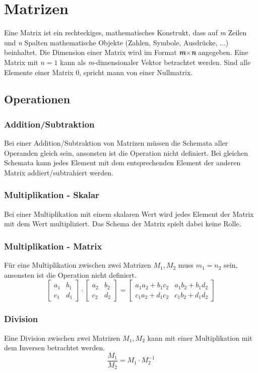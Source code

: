 \documentclass{article}
\author{Philipp Kiss}
\begin{document}
\section{Matrizen}
Eine Matrix ist ein rechteckiges, mathematisches Konstrukt, dass auf \textit{m} Zeilen und \textit{n} Spalten mathematische Objekte (Zahlen, Symbole, Ausdrücke, ...) beinhaltet. Die Dimension einer Matrix wird im Format \textbf{\textit{m}$\times$\textit{n}} angegeben. Eine Matrix mit $n = 1$ kann als \textit{m}-dimensionaler Vektor betrachtet werden. Sind alle Elemente einer Matrix 0, spricht mann von einer Nullmatrix.
\subsection{Operationen}
\subsubsection{Addition/Subtraktion}
Bei einer Addition/Subtraktion von Matrizen müssen die Schemata aller Operanden gleich sein, ansonsten ist die Operation nicht definiert. Bei gleichen Schemata kann jedes Element mit dem entsprechenden Element der anderen Matrix addiert/subtrahiert werden.
\subsubsection{Multiplikation - Skalar}
Bei einer Multiplikation mit einem skalaren Wert wird jedes Element der Matrix mit dem Wert multipliziert. Das Schema der Matrix spielt dabei keine Rolle.
\subsubsection{Multiplikation - Matrix}
Für eine Multiplikation zwischen zwei Matrizen $M_1, M_2$ muss $m_1 = n_2$ sein, ansonsten ist die Operation nicht definiert.
$$
\begin{bmatrix}
a_1 & b_1\\
c_1 & d_1
\end{bmatrix}
\cdot
\begin{bmatrix}
a_2 & b_2 \\
c_2 & d_2
\end{bmatrix}
= 
\begin{bmatrix}
a_1 a_2 + b_1	c_2 & a_1 b_2 + b_1 d_2 \\
c_1 a_2 + d_1 c_2 & c_1	b_2 + d_1 d_2
\end{bmatrix}
$$
\subsubsection{Division}
Eine Division zwischen zwei Matrizen $M_1, M_2$ kann mit einer Multiplikation mit dem Inversen betrachtet werden.
$$ \frac{M_1}{M_2} = M_1 \cdot M_2^{-1}$$
\end{document}
